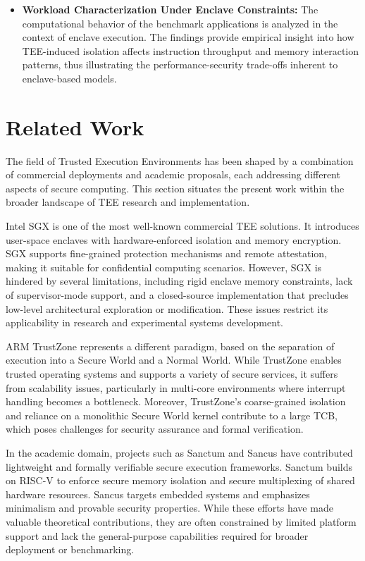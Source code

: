 \begin{itemize}
\item \textbf{Workload Characterization Under Enclave Constraints:}  
The computational behavior of the benchmark applications is analyzed in the context of enclave execution. The findings provide empirical insight into how TEE-induced isolation affects instruction throughput and memory interaction patterns, thus illustrating the performance-security trade-offs inherent to enclave-based models.
\end{itemize}

\section{Related Work}

The field of Trusted Execution Environments has been shaped by a combination of commercial deployments and academic proposals, each addressing different aspects of secure computing. This section situates the present work within the broader landscape of TEE research and implementation.

Intel SGX is one of the most well-known commercial TEE solutions. It introduces user-space enclaves with hardware-enforced isolation and memory encryption. SGX supports fine-grained protection mechanisms and remote attestation, making it suitable for confidential computing scenarios. However, SGX is hindered by several limitations, including rigid enclave memory constraints, lack of supervisor-mode support, and a closed-source implementation that precludes low-level architectural exploration or modification. These issues restrict its applicability in research and experimental systems development.

ARM TrustZone represents a different paradigm, based on the separation of execution into a Secure World and a Normal World. While TrustZone enables trusted operating systems and supports a variety of secure services, it suffers from scalability issues, particularly in multi-core environments where interrupt handling becomes a bottleneck. Moreover, TrustZone's coarse-grained isolation and reliance on a monolithic Secure World kernel contribute to a large TCB, which poses challenges for security assurance and formal verification.

In the academic domain, projects such as Sanctum and Sancus have contributed lightweight and formally verifiable secure execution frameworks. Sanctum builds on RISC-V to enforce secure memory isolation and secure multiplexing of shared hardware resources. Sancus targets embedded systems and emphasizes minimalism and provable security properties. While these efforts have made valuable theoretical contributions, they are often constrained by limited platform support and lack the general-purpose capabilities required for broader deployment or benchmarking.

